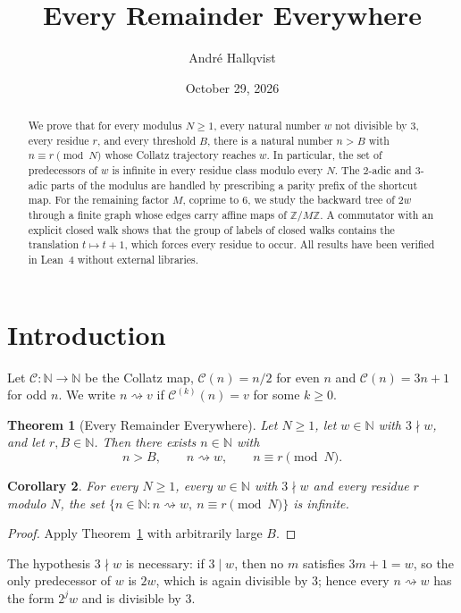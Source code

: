 \documentclass[11pt,reqno,oneside]{amsart}
\title[Every Remainder Everywhere]{Every Remainder Everywhere}
\author{André Hallqvist}
\date{October 29, 2026}
\theoremstyle{plain}
\newtheorem{theorem}{Theorem}[section]
\newtheorem{corollary}[theorem]{Corollary}
\theoremstyle{definition}
\numberwithin{equation}{section}
\newcommand{\N}{\mathbb{N}}
\newcommand{\C}{\mathcal{C}}
\newcommand{\reaches}{\rightsquigarrow}
\begin{document}
\begin{abstract}
We prove that for every modulus $N \ge 1$, every natural number $w$ not divisible by $3$, every residue $r$, and every threshold $B$, there is a natural number $n > B$ with $n \equiv r \pmod N$ whose Collatz trajectory reaches $w$. In particular, the set of predecessors of $w$ is infinite in every residue class modulo every $N$. The $2$-adic and $3$-adic parts of the modulus are handled by prescribing a parity prefix of the shortcut map. For the remaining factor $M$, coprime to $6$, we study the backward tree of $2w$ through a finite graph whose edges carry affine maps of $\mathbb{Z}/M\mathbb{Z}$. A commutator with an explicit closed walk shows that the group of labels of closed walks contains the translation $t\mapsto t+1$, which forces every residue to occur. All results have been verified in Lean~4 without external libraries.
\end{abstract}
\maketitle

\section{Introduction}\label{sec:intro}
Let $\C\colon\N\to\N$ be the Collatz map, $\C(n)=n/2$ for even $n$ and $\C(n)=3n+1$ for odd $n$. We write $n\reaches v$ if $\C^{(k)}(n)=v$ for some $k\ge 0$.

\begin{theorem}[Every Remainder Everywhere]\label{thm:main}
Let $N\ge 1$, let $w\in\N$ with $3\nmid w$, and let $r,B\in\N$. Then there exists $n\in\N$ with
\[
n>B,\qquad n\reaches w,\qquad n\equiv r \pmod N.
\]
\end{theorem}

\begin{corollary}\label{cor:infinite}
For every $N\ge 1$, every $w\in\N$ with $3\nmid w$ and every residue $r$ modulo $N$, the set $\{n\in\N : n\reaches w,\ n\equiv r \pmod N\}$ is infinite.
\end{corollary}
\begin{proof}
Apply Theorem~\ref{thm:main} with arbitrarily large $B$.
\end{proof}

The hypothesis $3\nmid w$ is necessary: if $3\mid w$, then no $m$ satisfies $3m+1=w$, so the only predecessor of $w$ is $2w$, which is again divisible by $3$; hence every $n\reaches w$ has the form $2^jw$ and is divisible by $3$.
\end{document}
